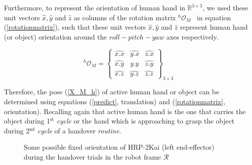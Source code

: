 Furthermore, to represent the orientation of human hand in $\mathbb{R}^{3\times3}$, we used these unit vectors $\hat{x}, \hat{y}$ and $\hat{z}$ as columns of the rotation matrix ${}^{h}\mathcal{O}_{M}$~\cite{evans2001rotations, altmann2005rotations, jia2017rotation} in equation (\ref{rotationmatrix}), such that these unit vectors $\hat{x}, \hat{y}$ and $\hat{z}$ represent human hand (or object) orientation around the $roll-pitch-yaw$ axes respectively.

\begin{equation}\label{rotationmatrix}
{}^{h}\mathcal{O}_{M} = 
\left\{\begin{array}{cccc}
\hat{x.x} & \hat{y.x} & \hat{z.x} \\
\hat{x.y} & \hat{y.y} & \hat{z.y} \\
\hat{x.z} & \hat{y.z} & \hat{z.z}
\end{array}\right\}_{3\times 3}
\end{equation}

Therefore, the pose (\ref{X_M_h}) of active human hand or object can be determined using equations (\ref{predict}, translation) and (\ref{rotationmatrix}, orientation). Recalling again that active human hand is the one that carries the object during 1$^\text{st}$ \textit{cycle} or the hand which is approaching to grasp the object during 2$^\text{nd}$ \textit{cycle} of a handover \textit{routine}.

\begin{figure}[htpb]
	\caption{Some possible fixed orientation of HRP-2Kai (left end-effector) during the handover trials in the robot frame $\mathcal{R}$}
	\label{fig:robot_lt_hand_2layers}
\end{figure} 



